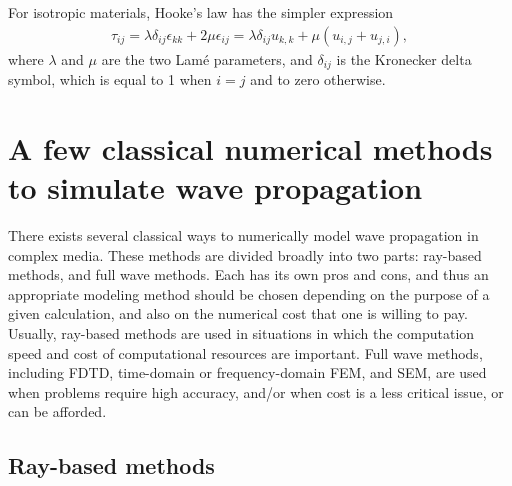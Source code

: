         For isotropic materials, Hooke's law has the simpler expression
        \begin{align} \label{eq:1_50}
            \tau_{ij}=\lambda\delta_{ij} \epsilon_{kk}+ 2\mu\epsilon_{ij}=\lambda\delta_{ij} u_{k,k}+\mu(u_{i,j}+u_{j,i}),
        \end{align}
where $\lambda$ and $\mu$ are the two Lam\'e parameters, and $\delta_{ij}$ is the Kronecker delta symbol, which is equal to 1 when $i = j$ and to zero otherwise.

\section{A few classical numerical methods to simulate wave propagation}

    There exists several classical ways to numerically model wave propagation in complex media. These methods are divided broadly into two parts: ray-based methods,
and full wave methods. Each has its own pros and cons, and thus an appropriate modeling method should be chosen depending on the purpose of a given calculation,
and also on the numerical cost that one is willing to pay.
    Usually, ray-based methods are used in situations in which  the computation speed and cost of computational resources are important.
    Full wave methods, including FDTD, time-domain or frequency-domain FEM, and SEM, are used when problems require high accuracy, and/or when cost is a less critical issue, or can be afforded.

    \subsection{Ray-based methods}

